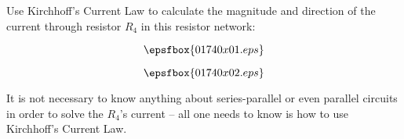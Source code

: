 

Use Kirchhoff's Current Law to calculate the magnitude and direction of the current through resistor $R_4$ in this resistor network:

$$\epsfbox{01740x01.eps}$$







$$\epsfbox{01740x02.eps}$$







It is not necessary to know anything about series-parallel or even parallel circuits in order to solve the $R_4$'s current -- all one needs to know is how to use Kirchhoff's Current Law.




